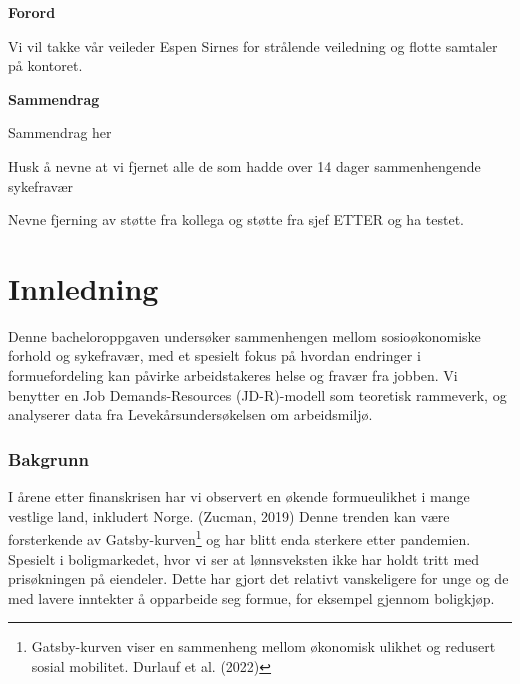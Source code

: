 \documentclass[
  12pt,
  a4paper,
  DIV=11,
  numbers=noendperiod]{scrartcl}
\renewcommand*\contentsname{Table of contents}
\newcommand\contentsname{Table of contents}
\begin{document}




\thispagestyle{plain}
\begin{center}
    \Large
    \textbf{Forord}
\end{center}

Vi vil takke vår veileder Espen Sirnes for strålende veiledning og
flotte samtaler på kontoret.

\newpage
\hypersetup{linkcolor=black}
\renewcommand{\contentsname}{Innholdsfortegnelse}
\renewcommand*{\figureautorefname}{Figur}
\renewcommand*{\tableautorefname}{Tabell}
\renewcommand*{\equationautorefname}{Ligning:}
\tableofcontents
\listoffigures
\listoftables
\hypersetup{linkcolor=blue}
\newpage
\thispagestyle{plain}
\begin{center}
    \Large
    \textbf{Sammendrag}
\end{center}

Sammendrag her

Husk å nevne at vi fjernet alle de som hadde over 14 dager
sammenhengende sykefravær

Nevne fjerning av støtte fra kollega og støtte fra sjef ETTER og ha
testet.

\newpage

\section{Innledning}\label{innledning}

Denne bacheloroppgaven undersøker sammenhengen mellom sosioøkonomiske
forhold og sykefravær, med et spesielt fokus på hvordan endringer i
formuefordeling kan påvirke arbeidstakeres helse og fravær fra jobben.
Vi benytter en Job Demands-Resources (JD-R)-modell som teoretisk
rammeverk, og analyserer data fra Levekårsundersøkelsen om arbeidsmiljø.

\subsubsection{Bakgrunn}\label{bakgrunn}

I årene etter finanskrisen har vi observert en økende formueulikhet i
mange vestlige land, inkludert Norge. (Zucman, 2019) Denne trenden kan
være forsterkende av Gatsby-kurven\footnote{Gatsby-kurven viser en
  sammenheng mellom økonomisk ulikhet og redusert sosial mobilitet.
  Durlauf et al. (2022)} og har blitt enda sterkere etter pandemien.
Spesielt i boligmarkedet, hvor vi ser at lønnsveksten ikke har holdt
tritt med prisøkningen på eiendeler. Dette har gjort det relativt
vanskeligere for unge og de med lavere inntekter å opparbeide seg
formue, for eksempel gjennom boligkjøp.
\end{document}
